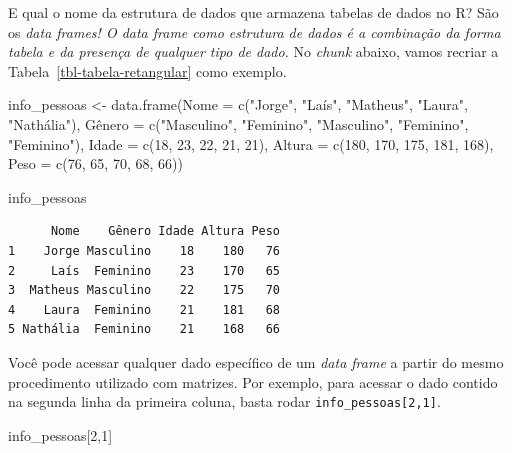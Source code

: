 \documentclass[
  letterpaper,
  DIV=11,
  numbers=noendperiod]{scrreprt}
\newenvironment{Shaded}{\begin{snugshade}}{\end{snugshade}}
\newcommand{\AttributeTok}[1]{\textcolor[rgb]{0.40,0.45,0.13}{#1}}
\newcommand{\DecValTok}[1]{\textcolor[rgb]{0.68,0.00,0.00}{#1}}
\newcommand{\FunctionTok}[1]{\textcolor[rgb]{0.28,0.35,0.67}{#1}}
\newcommand{\NormalTok}[1]{\textcolor[rgb]{0.00,0.23,0.31}{#1}}
\newcommand{\OtherTok}[1]{\textcolor[rgb]{0.00,0.23,0.31}{#1}}
\newcommand{\StringTok}[1]{\textcolor[rgb]{0.13,0.47,0.30}{#1}}
\begin{document}
E qual o nome da estrutura de dados que armazena tabelas de dados no R?
São os \emph{data frames! O data frame como estrutura de dados é a
combinação da forma tabela e da presença de qualquer tipo de dado.} No
\emph{chunk} abaixo, vamos recriar a Tabela~\ref{tbl-tabela-retangular}
como exemplo.

\begin{Shaded}
\begin{Highlighting}[]
\NormalTok{info\_pessoas }\OtherTok{\textless{}{-}} \FunctionTok{data.frame}\NormalTok{(}\AttributeTok{Nome =} \FunctionTok{c}\NormalTok{(}\StringTok{"Jorge"}\NormalTok{, }\StringTok{"Laís"}\NormalTok{, }\StringTok{"Matheus"}\NormalTok{, }\StringTok{"Laura"}\NormalTok{, }\StringTok{"Nathália"}\NormalTok{),}
\NormalTok{                           Gênero }\OtherTok{=} \FunctionTok{c}\NormalTok{(}\StringTok{"Masculino"}\NormalTok{, }\StringTok{"Feminino"}\NormalTok{, }\StringTok{"Masculino"}\NormalTok{, }\StringTok{"Feminino"}\NormalTok{, }\StringTok{"Feminino"}\NormalTok{),}
                           \AttributeTok{Idade =} \FunctionTok{c}\NormalTok{(}\DecValTok{18}\NormalTok{, }\DecValTok{23}\NormalTok{, }\DecValTok{22}\NormalTok{, }\DecValTok{21}\NormalTok{, }\DecValTok{21}\NormalTok{),}
                           \AttributeTok{Altura =} \FunctionTok{c}\NormalTok{(}\DecValTok{180}\NormalTok{, }\DecValTok{170}\NormalTok{, }\DecValTok{175}\NormalTok{, }\DecValTok{181}\NormalTok{, }\DecValTok{168}\NormalTok{),}
                           \AttributeTok{Peso =} \FunctionTok{c}\NormalTok{(}\DecValTok{76}\NormalTok{, }\DecValTok{65}\NormalTok{, }\DecValTok{70}\NormalTok{, }\DecValTok{68}\NormalTok{, }\DecValTok{66}\NormalTok{))}

\NormalTok{info\_pessoas}
\end{Highlighting}
\end{Shaded}

\begin{verbatim}
      Nome    Gênero Idade Altura Peso
1    Jorge Masculino    18    180   76
2     Laís  Feminino    23    170   65
3  Matheus Masculino    22    175   70
4    Laura  Feminino    21    181   68
5 Nathália  Feminino    21    168   66
\end{verbatim}

Você pode acessar qualquer dado específico de um \emph{data frame} a
partir do mesmo procedimento utilizado com matrizes. Por exemplo, para
acessar o dado contido na segunda linha da primeira coluna, basta rodar
\texttt{info\_pessoas{[}2,1{]}}.

\begin{Shaded}
\begin{Highlighting}[]
\NormalTok{info\_pessoas[}\DecValTok{2}\NormalTok{,}\DecValTok{1}\NormalTok{]}
\end{Highlighting}
\end{Shaded}
\end{document}
